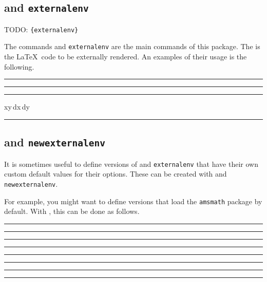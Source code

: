 \documentclass[10pt]{ltxdoc}
\newcommand{\env}[1]{\texttt{#1}}
\newcommand{\pkg}[1]{\texttt{#1}}
\def\gauge{%
  \rule{0.2em}{7pt}%
  \llap{\rule[8pt]{0.2em}{2pt}}%
}
\begin{document}
\subsection{ and \env{externalenv}}
\label{subsec:external and externalenv}


TODO: \texttt{\{externalenv\}}

The commands  and \env{externalenv} are the main commands
of this package.
The  is the \LaTeX\ code to be externally rendered.
An examples of their usage is the following.

\begin{tcblisting}{}
\gauge
{}%
\gauge

\gauge
\begin{externalenv}[preamble={\usepackage{amsmath}},math=inline]
\iint xy\,dx\,dy%
\end{externalenv}
\gauge
\end{tcblisting}

\subsection{ and \env{newexternalenv}}
\label{subsec:newexternal and newexternalenv}



It is sometimes useful to define versions of  and
\env{externalenv} that have their own custom default values for their
options.
These can be created with  and \env{newexternalenv}.

For example, you might want to define versions that load the
\pkg{amsmath} package by default.
With , this can be done as follows.

\begin{tcblisting}{}
\gauge\newexternal[preamble={\usepackage{amsmath}}, math=inline]
  {\ams}\gauge

\gauge{}\gauge

\gauge{}\gauge

\gauge{}\gauge
\end{tcblisting}
\end{document}
